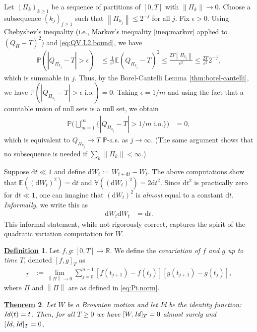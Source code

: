 \documentclass[12pt]{book}
\let\varepsilon\epsilon
\numberwithin{equation}{chapter}
\theoremstyle{plain}
\newtheorem{theorem}{\underline{Theorem}}
\numberwithin{theorem}{section}
\theoremstyle{definition}
\newtheorem{definition}[theorem]{\underline{Definition}}
\numberwithin{exercise}{chapter}
\let\oldendproof\endproof
\renewenvironment{proof}[1][\proofname]{%
  \oldproof[\scshape\underline{#1}]%
}{\oldendproof}
\newcommand{\<}{\langle}
\renewcommand{\>}{\rangle}
\renewcommand{\(}{\left(}
\renewcommand{\)}{\right)}
\renewcommand{\[}{\left[}
\renewcommand{\]}{\right]}
\newcommand\Eb{\mathds{E}}
\newcommand\Pb{\mathds{P}}
\newcommand\Rb{\mathds{R}}
\newcommand\Vb{\mathds{V}}
\newcommand\eps{\varepsilon}
\newcommand\dd{\mathrm{d}}
\newcommand{\norm}[1]{\left\|#1\right\|}
\begin{document}
\begin{proof}
Let $(\Pi_k)_{k \geq 1}$ be a sequence of partitions of $[0,T]$ with $\norm{\Pi_k} \to 0$.  Choose a subsequence $(k_j)_{j \geq 1}$ such that $\norm{\Pi_{k_j}} \leq 2^{-j}$ for all $j$.  Fix $\eps > 0$.  Using Chebyshev's inequality (i.e., Markov's inequality \eqref{ineq:markov} applied to $(Q_\Pi - T)^2$) and \eqref{eq:QV.L2.bound}, we have
\begin{align}
\Pb ( | Q_{\Pi_{k_j}} - T | > \eps )
	&\leq	\frac{1}{\eps^2} \Eb ( Q_{\Pi_{k_j}} - T )^2
	\leq	\frac{2 T \norm{\Pi_{k_j}}}{\eps^2}
	\leq	\frac{2 T}{\eps^2} 2^{-j} ,
\end{align}
which is summable in $j$.  Thus, by the Borel-Cantelli Lemma \ref{thm:borel-cantelli}, we have $\Pb ( | Q_{\Pi_{k_j}} - T | > \eps \text{ i.o.} ) = 0$.  Taking $\eps = 1/m$ and using the fact that a countable union of null sets is a null set, we obtain
\begin{align}
\Pb \Big( \bigcup_{m=1}^\infty \{ | Q_{\Pi_{k_j}} - T | > 1/m \text{ i.o.} \} \Big)
	&=	0 ,
\end{align}
which is equivalent to $Q_{\Pi_{k_j}} \to T$ $\Pb$-a.s. as $j \to \infty$.  (The same argument shows that no subsequence is needed if $\sum_k \norm{\Pi_k} < \infty$.)
\end{proof}

\noindent
Suppose $\dd t \ll 1$ and define $\dd W_t := W_{t + \dd t}- W_t$.  The above computations show that $\Eb( (\dd W_t)^2 ) = \dd t$ and $\Vb( (\dd W_t)^2 ) = 2 \dd t^2$.  Since $\dd t^2$ is practically zero for $\dd t \ll 1$, one can imagine that $(\dd W_t)^2$ is \emph{almost} equal to a constant $\dd t$.  \emph{Informally}, we write this as
\begin{align}
\dd W_t \dd W_t
	&=	\dd t . \label{eq:dW2.dt}
\end{align}
This informal statement, while not rigorously correct, captures the spirit of the quadratic variation computation for $W$.

\begin{definition}
\label{def:CoV}
Let $f,g :[0,T] \to \Rb$. We define the \emph{covariation of $f$ and $g$ up to time $T$}, denoted $[f,g]_T$ as
\begin{align}
[f,g]_T
	&:=	\lim_{\norm{\Pi} \to 0} \sum_{j=0}^{n-1} \[ f(t_{j+1}) - f(t_j) \] \[ g(t_{j+1}) - g(t_j) \] ,
\end{align}
where $\Pi$ and $\norm{\Pi}$ are as defined in \eqref{eq:Pi.norm}.  
\end{definition}

\begin{theorem}
\label{thm:CoV}
Let $W$ be a Brownian motion and let \emph{Id} be the identity function: $\text{\emph{Id}}(t)=t$.  Then, for all $T \geq 0$ we have $[W,\text{\emph{Id}}]_T = 0$ almost surely and $[\text{\emph{Id}},\text{\emph{Id}}]_T = 0$.
\end{theorem}
\end{document}
